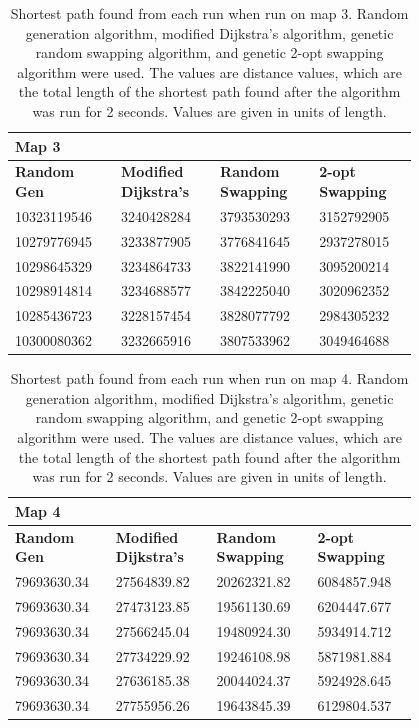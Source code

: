 \documentclass{article}
\begin{document}
\begin{appendices}
\begin{table}[H]
    \caption{Shortest path found from each run when run on map 3. Random generation algorithm, modified Dijkstra's algorithm, genetic random swapping algorithm, and genetic 2-opt swapping algorithm were used. The values are distance values, which are the total length of the shortest path found after the algorithm was run for 2 seconds. Values are given in units of length.}
    \centering
    \begin{tabular}{|p{0.2\linewidth}|p{0.2\linewidth}|p{0.2\linewidth}|p{0.2\linewidth}|}
    \hline
        \textbf{Map 3} & ~ & ~ & ~ \\ \hline
        \textbf{Random Gen} & \textbf{Modified Dijkstra's} & \textbf{Random Swapping} & \textbf{2-opt Swapping} \\ \hline
        10323119546 & 3240428284 & 3793530293 & 3152792905 \\ \hline
        10279776945 & 3233877905 & 3776841645 & 2937278015 \\ \hline
        10298645329 & 3234864733 & 3822141990 & 3095200214 \\ \hline
        10298914814 & 3234688577 & 3842225040 & 3020962352 \\ \hline
        10285436723 & 3228157454 & 3828077792 & 2984305232 \\ \hline
        10300080362 & 3232665916 & 3807533962 & 3049464688 \\ \hline
    \end{tabular}
\end{table}

\begin{table}[H]
    \caption{Shortest path found from each run when run on map 4. Random generation algorithm, modified Dijkstra's algorithm, genetic random swapping algorithm, and genetic 2-opt swapping algorithm were used. The values are distance values, which are the total length of the shortest path found after the algorithm was run for 2 seconds. Values are given in units of length.} \label{Table map 4}
    \centering
    \begin{tabular}{|p{0.2\linewidth}|p{0.2\linewidth}|p{0.2\linewidth}|p{0.2\linewidth}|}
    \hline
        \textbf{Map 4} & ~ & ~ & ~ \\ \hline
        \textbf{Random Gen} & \textbf{Modified Dijkstra's} & \textbf{Random Swapping} & \textbf{2-opt Swapping} \\ \hline
        79693630.34 & 27564839.82 & 20262321.82 & 6084857.948 \\ \hline
        79693630.34 & 27473123.85 & 19561130.69 & 6204447.677 \\ \hline
        79693630.34 & 27566245.04 & 19480924.30 & 5934914.712 \\ \hline
        79693630.34 & 27734229.92 & 19246108.98 & 5871981.884 \\ \hline
        79693630.34 & 27636185.38 & 20044024.37 & 5924928.645 \\ \hline
        79693630.34 & 27755956.26 & 19643845.39 & 6129804.537 \\ \hline
    \end{tabular}
\end{table}


\end{appendices}
\end{document}

